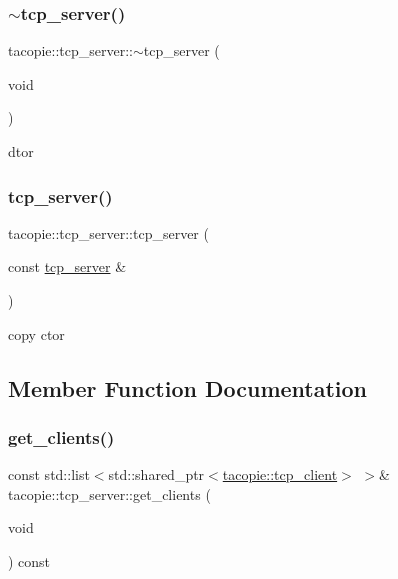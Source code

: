 \subsubsection{\texorpdfstring{$\sim$tcp\+\_\+server()}{~tcp\_server()}}
{\footnotesize\ttfamily tacopie\+::tcp\+\_\+server\+::$\sim$tcp\+\_\+server (\begin{DoxyParamCaption}\item[{void}]{ }\end{DoxyParamCaption})}



dtor 

\mbox{\label{classtacopie_1_1tcp__server_a2d9c6a2dea95a3c6a919c655d6e8e0ba}} 
\subsubsection{\texorpdfstring{tcp\+\_\+server()}{tcp\_server()}\hspace{0.1cm}{\footnotesize\ttfamily [2/2]}}
{\footnotesize\ttfamily tacopie\+::tcp\+\_\+server\+::tcp\+\_\+server (\begin{DoxyParamCaption}\item[{const \hyperlink{classtacopie_1_1tcp__server}{tcp\+\_\+server} \&}]{ }\end{DoxyParamCaption})\hspace{0.3cm}{\ttfamily [delete]}}



copy ctor 



\subsection{Member Function Documentation}
\mbox{\label{classtacopie_1_1tcp__server_a0df81b943243ad51102c37d4944be8d7}} 
\subsubsection{\texorpdfstring{get\+\_\+clients()}{get\_clients()}}
{\footnotesize\ttfamily const std\+::list$<$std\+::shared\+\_\+ptr$<$\hyperlink{classtacopie_1_1tcp__client}{tacopie\+::tcp\+\_\+client}$>$ $>$\& tacopie\+::tcp\+\_\+server\+::get\+\_\+clients (\begin{DoxyParamCaption}\item[{void}]{ }\end{DoxyParamCaption}) const}

